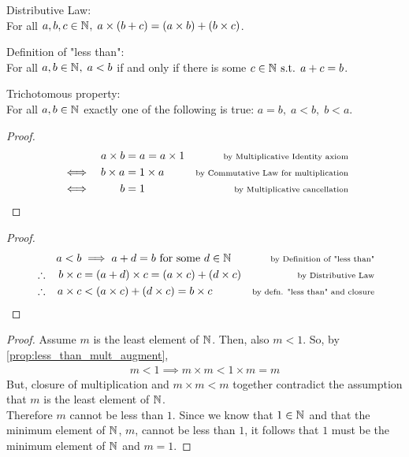 \documentclass[MathsNotesBase.tex]{subfiles}
\begin{document}
{		\begin{axiom}{Distributive Law:}\\ For all $a,b,c \in \mathbb{N}^{},\; a \times (b + c) = (a \times b) + (b \times c)$.
		\end{axiom}
		\begin{axiom}{Definition of "less than":}\\ For all $a,b \in \mathbb{N}^{},\; a < b$ if and only if there is some $c \in \mathbb{N}^{} \text{ s.t. } a + c = b$.
		\end{axiom}
		\begin{axiom}{Trichotomous property:}\\ For all $a,b \in \mathbb{N}^{}$ exactly one of the following is true: $a = b,\; a < b,\; b < a$.
		\end{axiom}
	
		\bigskip
				
			\begin{proof}
			\begin{align*}
			&& a \times b &= a = a \times 1 &\text{\scriptsize{by Multiplicative Identity axiom}}\\
			&\iff & b \times a &= 1 \times a  &\text{\scriptsize{by Commutative Law for multiplication}}\\
			&\iff & b &= 1  &\text{\scriptsize{by Multiplicative cancellation}}\\
			\end{align*}
			\end{proof}
		
			\begin{proof}
			\begin{align*}
			&& a < b &\implies a + d = b \text{ for some } d \in \mathbb{N}^{} &\text{\scriptsize{by Definition of "less than"}}\\
			&\therefore & b \times c &= (a + d) \times c = (a \times c) + (d \times c)  &\text{\scriptsize{by Distributive Law}}\\
			&\therefore & a \times c &< (a \times c) + (d \times c) = b \times c  &\text{\scriptsize{by defn. "less than" and closure}}
			\end{align*}
			\end{proof}
		
		\begin{proof}
			Assume $m$ is the least element of $\mathbb{N}^{}$. Then, also $m < 1$. So, by \autoref{prop:less_than_mult_augment},
			\begin{align*}
			m < 1 \implies m \times m < 1 \times m = m
			\end{align*}
			But, closure of multiplication and $m \times m < m$ together contradict the assumption that $m$ is the least element of $\mathbb{N}^{}$.\\
			Therefore $m$ cannot be less than $1$. Since we know that $1 \in \mathbb{N}^{}$ and that the minimum element of $\mathbb{N}^{}$, $m$, cannot be less than $1$, it follows that $1$ must be the minimum element of $\mathbb{N}^{}$ and $m = 1$.
		\end{proof}
	}
\end{document}
